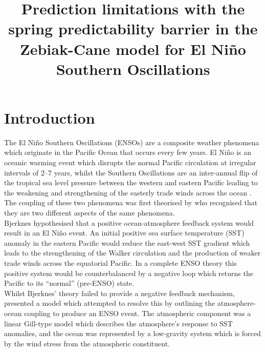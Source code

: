 \documentclass[12pt, onecolumn]{revtex4}    %
\begin{document}
                     

\title{Prediction limitations with the spring predictability barrier in the Zebiak-Cane model for El Ni\~{n}o Southern Oscillations} 

\maketitle
\thispagestyle{plain} %

\section{Introduction}
The El Ni\~{n}o Southern Oscillations (ENSOs) are a composite weather phenomena which originate in the Pacific Ocean that occurs every few years. El Ni\~{n}o is an oceanic warming event which disrupts the normal Pacific circulation at irregular intervals of 2--7 years, whilst the Southern Oscillations are an inter-annual flip of the tropical sea level pressure between the western and eastern Pacific leading to the weakening and strengthening of the easterly trade winds across the ocean \citep{wang2017nino}. The coupling of these two phenomena was first theorised by \cite{doi:10.1175/1520-04931969097} who recognised that they are two different aspects of the same phenomena. \\

Bjerknes hypothesised that a positive ocean-atmosphere feedback system would result in an El Ni\~{n}o event. An initial positive sea surface temperature (SST) anomaly in the eastern Pacific would reduce the east-west SST gradient which leads to the strengthening of the Walker circulation and the production of weaker trade winds across the equatorial Pacific. In a complete ENSO theory this positive system would be counterbalanced by a negative loop which returns the Pacific to its ``normal'' (pre-ENSO) state. \\

Whilst Bjerknes' theory failed to provide a negative feedback mechanism, \cite{Zebiak:1987aa} presented a model which attempted to resolve this by outlining the atmosphere-ocean coupling to produce an ENSO event. The atmospheric component was a linear Gill-type model \citep{Gill:1980aa} which describes the atmosphere's response to SST anomalies, and the ocean was represented by a low-gravity system which is forced by the wind stress from the atmospheric constituent. \\
\end{document}
